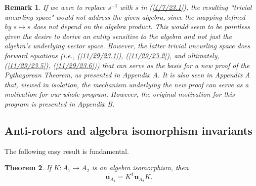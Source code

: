 \documentclass{amsart}
\numberwithin{equation}{section}
\newtheorem{theorem}{Theorem}
\newtheorem{remark}[theorem]{Remark}
\theoremstyle{definition}
\numberwithin{theorem}{section}
\begin{document}
\begin{remark}\label{11/21/23.1} {\rm If we were to replace $s^{-1}$ with $s$ in (\ref{4/7/23.1}), the resulting ``trivial uncurling space" would not address the given algebra, since the mapping defined by $s\mapsto s$ does not depend on the algebra product.  This would seem to be pointless given the desire to derive an entity sensitive to the algebra and not just the algebra's underlying vector space.  However, the latter trivial uncurling space does forward equations (i.e., (\ref{11/29/23.1}), (\ref{11/29/23.2}), and ultimately, (\ref{11/29/23.5}), (\ref{11/29/23.6})) that can serve as the basis for a new proof of the Pythagorean Theorem, as presented in Appendix A. \enlargethispage{1cm} It is also seen in Appendix A that, viewed in isolation, the mechanism underlying the new proof can serve as a motivation for our whole program.  However, the original motivation for this program is presented in Appendix B.  }\end{remark}



\subsection{Anti-rotors and algebra isomorphism invariants} The following easy result is fundamental.


\begin{theorem} \label{6/6/23.1} If $K:A_1\rightarrow A_2$ is an algebra isomorphism, then \begin{equation}\label{5/23/23.1} \mathbf{u}_{A_1} = K^T \mathbf{u}_{A_2} K. \end{equation} \end{theorem}
\end{document}

